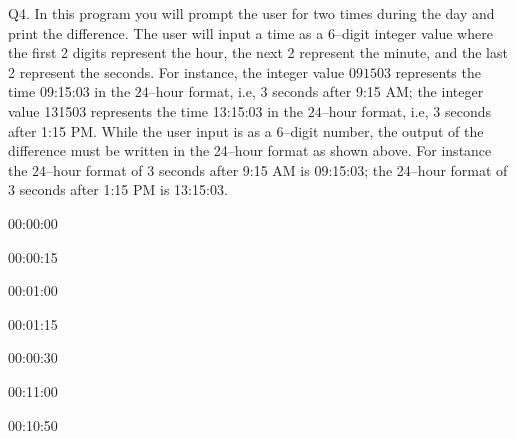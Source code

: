 Q4.
In this program you will prompt the user for two times during the day and print the difference. The
user will input a time as a $6$--digit integer value where the first 2 digits represent the hour, the next 2
represent the minute, and the last 2 represent the seconds. For instance, the integer value $091503$
represents the time 09:15:03 in the $24$--hour format, i.e, 3 seconds after 9:15 AM; the integer value
131503 represents the time 13:15:03 in the $24$--hour format, i.e, 3 seconds after 1:15 PM. While the
user input is as a 6--digit number, the output of the difference must be written in the 24--hour format as
shown above. For instance the $24$--hour format of $3$ seconds after 9:15 AM is 09:15:03; the 24--hour
format of 3 seconds after 1:15 PM is 13:15:03.

\resett
\nextt
\begin{console}[commandchars=\\\{\}]
00:00:00
\end{console}

\nextt
\begin{console}[commandchars=\\\{\}]
00:00:15
\end{console}

\nextt
\begin{console}[commandchars=\\\{\}]
00:01:00
\end{console}

\nextt
\begin{console}[commandchars=\\\{\}]
00:01:15
\end{console}

\nextt
\begin{console}[commandchars=\\\{\}]
00:00:30
\end{console}

\nextt
\begin{console}[commandchars=\\\{\}]
00:11:00
\end{console}

\nextt
\begin{console}[commandchars=\\\{\}]
00:10:50
\end{console}


